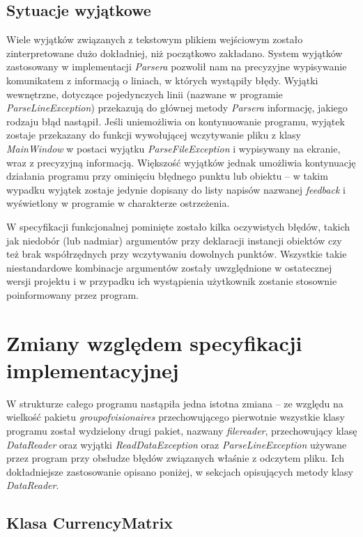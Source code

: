 \documentclass[a4paper,12pt]{article}
\newcommand\tab[1][0.6cm]{\hspace*{#1}}
\begin{document}
\subsection{Sytuacje wyjątkowe}

\tab Wiele wyjątków związanych z tekstowym plikiem wejściowym zostało zinterpretowane dużo dokładniej, niż początkowo zakładano. System wyjątków zastosowany w implementacji \textit{Parsera} pozwolił nam na precyzyjne wypisywanie komunikatem z informacją o liniach, w których wystąpiły błędy.
 Wyjątki wewnętrzne, dotyczące pojedynczych linii (nazwane w programie \textit{ParseLineException}) przekazują do głównej metody \textit{Parsera} informację, jakiego rodzaju błąd nastąpił. Jeśli uniemożliwia on kontynuowanie programu, wyjątek zostaje przekazany do funkcji wywołującej wczytywanie pliku z klasy \textit{MainWindow} w postaci wyjątku \textit{ParseFileException} i wypisywany na ekranie, wraz z precyzyjną informacją. Większość wyjątków jednak umożliwia kontynuację działania programu przy ominięciu błędnego punktu lub obiektu -- w takim wypadku wyjątek zostaje jedynie dopisany do listy napisów nazwanej \textit{feedback} i wyświetlony w programie w charakterze ostrzeżenia.

W specyfikacji funkcjonalnej pominięte zostało kilka oczywistych błędów, takich jak niedobór (lub nadmiar) argumentów przy deklaracji instancji obiektów czy też brak współrzędnych przy wczytywaniu dowolnych punktów. Wszystkie takie niestandardowe kombinacje argumentów zostały uwzględnione w ostatecznej wersji projektu i w przypadku ich wystąpienia użytkownik zostanie stosownie poinformowany przez program.

\section{Zmiany względem specyfikacji implementacyjnej}

\tab W strukturze całego programu nastąpiła jedna istotna zmiana -- ze względu na wielkość pakietu \textit{groupofvisionaires} przechowującego pierwotnie wszystkie klasy programu został wydzielony drugi pakiet, nazwany \textit{filereader}, przechowujący klasę \textit{DataReader} oraz wyjątki \textit{ReadDataException} oraz \textit{ParseLineException} używane przez program przy obsłudze błędów związanych właśnie z odczytem pliku. Ich dokładniejsze zastosowanie opisano poniżej, w sekcjach opisujących metody klasy \textit{DataReader}.

\subsection{Klasa CurrencyMatrix}
\end{document}
